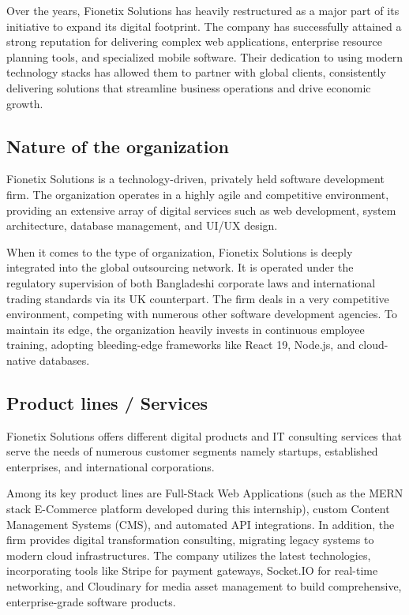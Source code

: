 \documentclass[12pt,a4paper]{report}
\begin{document}
Over the years, Fionetix Solutions has heavily restructured as a major part of its initiative to expand its digital footprint. The company has successfully attained a strong reputation for delivering complex web applications, enterprise resource planning tools, and specialized mobile software. Their dedication to using modern technology stacks has allowed them to partner with global clients, consistently delivering solutions that streamline business operations and drive economic growth.

\subsection{Nature of the organization}
Fionetix Solutions is a technology-driven, privately held software development firm. The organization operates in a highly agile and competitive environment, providing an extensive array of digital services such as web development, system architecture, database management, and UI/UX design.

When it comes to the type of organization, Fionetix Solutions is deeply integrated into the global outsourcing network. It is operated under the regulatory supervision of both Bangladeshi corporate laws and international trading standards via its UK counterpart. The firm deals in a very competitive environment, competing with numerous other software development agencies. To maintain its edge, the organization heavily invests in continuous employee training, adopting bleeding-edge frameworks like React 19, Node.js, and cloud-native databases.

\subsection{Product lines / Services}
Fionetix Solutions offers different digital products and IT consulting services that serve the needs of numerous customer segments namely startups, established enterprises, and international corporations.

Among its key product lines are Full-Stack Web Applications (such as the MERN stack E-Commerce platform developed during this internship), custom Content Management Systems (CMS), and automated API integrations. In addition, the firm provides digital transformation consulting, migrating legacy systems to modern cloud infrastructures. The company utilizes the latest technologies, incorporating tools like Stripe for payment gateways, Socket.IO for real-time networking, and Cloudinary for media asset management to build comprehensive, enterprise-grade software products.
\end{document}
